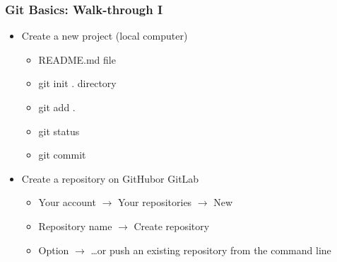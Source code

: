 \documentclass[t]{beamer}
\begin{document}
\begin{frame}[fragile]
    \frametitle{Git Basics: Walk-through I}
    \begin{itemize}
        \item Create a new project (local computer)
            \begin{itemize}
                \item README.md file
                \item git init . directory
                \item git add .
                \item git status 
                \item git commit 
            \end{itemize}
        \item Create a repository on GitHub\footnotemark or GitLab
            \begin{itemize}
                \item Your account $\rightarrow$ Your repositories $\rightarrow$ New 
                \item Repository name $\rightarrow$ Create repository
                \item Option $\rightarrow$ …or push an existing repository from the command line
            \end{itemize}
    \end{itemize}
\end{frame}
\end{document}
